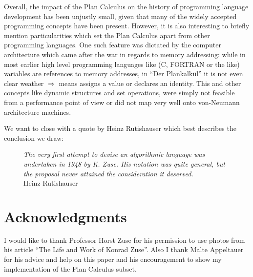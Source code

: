 \documentclass{llncs}
\begin{document}
   Overall, the impact of the Plan Calculus on the history of programming language
   development has been unjustly small, given that many of the widely accepted programming 
   concepts have been present. However, it is also interesting to briefly mention 
   particularities which set the Plan Calculus apart from other programming languages. 
   One such feature was dictated by the computer architecture which came after 
   the war in regards to memory addressing: while in most earlier high level programming 
   languages like (C, FORTRAN or the like) variables are references to memory addresses, 
   in ``Der Plankalkül'' it is not even clear weather $\Rightarrow$ means assigns a value 
   or declares an identity. This and other concepts like dynamic structures and set 
   operations, were simply not feasible from a performance point of view 
   or did not map very well onto von-Neumann architecture machines.

   We want to close with a quote by Heinz Rutishauser which best describes the 
   conclusion we draw:
   \begin{figure}[h!]
   \raggedright
   {\it The very first attempt to devise an algorithmic language was undertaken in 1948 by K. Zuse. His notation 
   was quite general, but the proposal never attained the consideration it deserved.}\\
   \raggedleft Heinz Rutishauser
     \label{fig:rutishauserquote}
   \end{figure}
 \clearpage
 \section*{Acknowledgments}
   I would like to thank Professor Horst Zuse for his permission to use photos from his article 
   ``The Life and Work of Konrad Zuse''. Also I thank Malte Appeltauer for his advice and help 
   on this paper and his encouragement to show my implementation of the Plan Calculus subset.
  
  
  \clearpage
\end{document}

